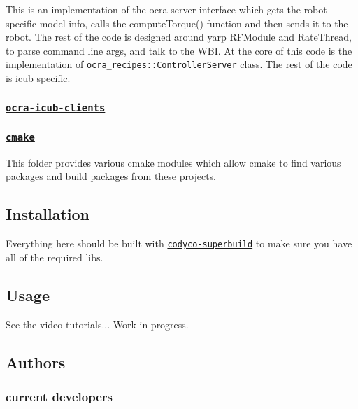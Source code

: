 This is an implementation of the ocra-\/server interface which gets the robot specific model info, calls the {\ttfamily compute\+Torque()} function and then sends it to the robot. The rest of the code is designed around yarp {\ttfamily R\+F\+Module} and {\ttfamily Rate\+Thread}, to parse command line args, and talk to the W\+BI. At the core of this code is the implementation of \href{https://github.com/ocra-recipes/ocra-recipes/tree/master/ocra-recipes/src/ContControllerServer.cpp}{\tt {\ttfamily ocra\+\_\+recipes\+::\+Controller\+Server}} class. The rest of the code is icub specific.

\subsubsection*{\href{https://github.com/ocra-recipes/ocra-wbi-plugins/tree/master/ocra-icub-clients}{\tt ocra-\/icub-\/clients}}

\subsubsection*{\href{https://github.com/ocra-recipes/ocra-wbi-plugins/tree/master/cmake}{\tt cmake}}

This folder provides various cmake modules which allow cmake to find various packages and build packages from these projects.

\subsection*{Installation}

Everything here should be built with \href{https://github.com/robotology/codyco-superbuild}{\tt {\ttfamily codyco-\/superbuild}} to make sure you have all of the required libs.

\subsection*{Usage}

See the video tutorials... Work in progress.

\subsection*{Authors}

\subsubsection*{current developers}


